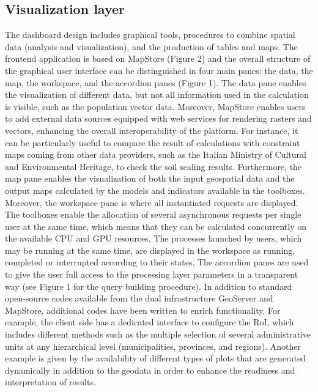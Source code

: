 \documentclass[APA,LATO1COL,doublespace]{WileyNJD-v2}
\begin{document}
\subsection{Visualization layer}
The dashboard design includes graphical tools, procedures to combine spatial data (analysis and visualization), and the production of tables and maps. The frontend application is based on MapStore (Figure 2) and the overall structure of the graphical user interface can be distinguished in four main panes: the data, the map, the workspace, and the accordion panes (Figure 1). The data pane enables the visualization of different data, but not all information used in the calculation is visible, such as the population vector data. Moreover, MapStore enables users to add external data sources equipped with web services for rendering rasters and vectors, enhancing the overall interoperability of the platform. For instance, it can be particularly useful to compare the result of calculations with constraint maps coming from other data providers, such as the Italian Ministry of Cultural and Environmental Heritage, to check the soil sealing results. Furthermore, the map pane enables the visualization of both the input geospatial data and the output maps calculated by the models and indicators available in the toolboxes. Moreover, the workspace pane is where all instantiated requests are displayed. The toolboxes enable the allocation of several asynchronous requests per single user at the same time, which means that they can be calculated concurrently on the available CPU and GPU resources. The processes launched by users, which may be running at the same time, are displayed in the workspace as running, completed or interrupted according to their states. The accordion panes are used to give the user full access to the processing layer parameters in a transparent way (see Figure 1 for the query building procedure).
In addition to standard open-source codes available from the dual infrastructure GeoServer and MapStore, additional codes have been written to enrich functionality. For example, the client side has a dedicated interface to configure the RoI, which includes different methods such as the multiple selection of several administrative units at any hierarchical level (municipalities, provinces, and regions). Another example is given by the availability of different types of plots that are generated dynamically in addition to the geodata in order to enhance the readiness and interpretation of results.
\end{document}
